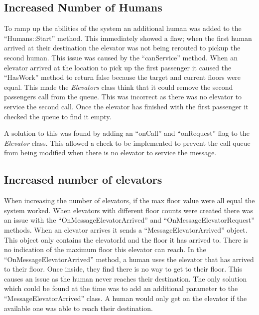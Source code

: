\documentclass{article}
\begin{document}
\subsection{Increased Number of Humans}
To ramp up the abilities of the system an additional human was added to the ``Humans::Start'' method.
This immediately showed a flaw; when the first human arrived at their destination the elevator was not being rerouted to pickup the second human.
This issue was caused by the ``canService'' method.
When an elevator arrived at the location to pick up the first passenger it caused the ``HasWork'' method to return false because the target and current floors were equal.
This made the \textit{Elevators} class think that it could remove the second passengers call from the queue. 
This was incorrect as there was no elevator to service the second call.
Once the elevator has finished with the first passenger it checked the queue to find it empty.

A solution to this was found by adding an ``onCall'' and ``onRequest'' flag to the \textit{Elevator} class.
This allowed a check to be implemented to prevent the call queue from being modified when there is no elevator to service the message.

\subsection{Increased number of elevators} 
When increasing the number of elevators, if the max floor value were all equal the system worked.
When elevators with different floor counts were created there was an issue with the ``OnMessageElevatorArrived'' and ``OnMessageElevatorRequest'' methods.
When an elevator arrives it sends a ``MessageElevatorArrived'' object. 
This object only contains the elevatorId and the floor it has arrived to.
There is no indication of the maximum floor this elevator can reach.
In the ``OnMessageElevatorArrived'' method, a human uses the elevator that has arrived to their floor.
Once inside, they find there is no way to get to their floor. 
This causes an issue as the human never reaches their destination.
The only solution which could be found at the time was to add an additional parameter to the ``MessageElevatorArrived'' class.
A human would only get on the elevator if the available one was able to reach their destination.\newline
\end{document}
